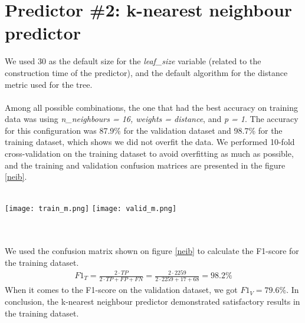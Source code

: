 \documentclass{article}
\newcommand{\enterProblemHeader}[1]{
\nobreak\extramarks{#1}{#1}\nobreak
\nobreak\extramarks{#1}{#1}\nobreak
}
\newcommand{\exitProblemHeader}[1]{
\nobreak\extramarks{#1}{#1}\nobreak
\nobreak\extramarks{#1}{}\nobreak
}
\newcounter{homeworkProblemCounter} %
\newcommand{\homeworkProblemName}{}
\newenvironment{homeworkProblem}[1][Problem \arabic{homeworkProblemCounter}]{ %
\stepcounter{homeworkProblemCounter} %
\renewcommand{\homeworkProblemName}{#1} %
\section{\homeworkProblemName} %
\enterProblemHeader{} %
}{
\exitProblemHeader{} %
}
\begin{document}
\begin{homeworkProblem}[Predictor \#2: k-nearest neighbour predictor]
\begin{itemize}
\end{itemize}
We used 30 as the default size for the \textit{leaf\_size} variable (related to the construction time of the predictor), and the default algorithm for the distance metric used for the tree. 
\\
\\
Among all possible combinations, the one that had the best accuracy on training data was using  \textit{n\_neighbours = 16, weights = distance}, and \textit{p = 1}. The accuracy for this configuration was 87.9\% for the validation dataset and 98.7\% for the training dataset, which shows we did not overfit the data. We performed 10-fold cross-validation on the training dataset to avoid overfitting as much as possible, and the training and validation confusion matrices are presented in the figure \ref{neib}.
\\
\\
\begin{minipage}{\textwidth}
\centering
    \texttt{[image: train\_m.png]}
    \texttt{[image: valid\_m.png]}
 \label{neib}
\end{minipage}
\\
\\
We used the confusion matrix shown on figure \ref{neib} to calculate the F1-score for the training dataset.
\begin{gather*}
    F1_T = \frac{2\cdot TP}{2\cdot TP + FP + FN} = \frac{2\cdot 2259}{2\cdot 2259 + 17 + 68} = \boldsymbol{98.2\%}
\end{gather*}
When it comes to the F1-score on the validation dataset, we got $F1_{V} = 79.6\%$. In conclusion, the k-nearest neighbour predictor demonstrated satisfactory results in the training dataset.
\end{homeworkProblem}
\clearpage
\end{document}
